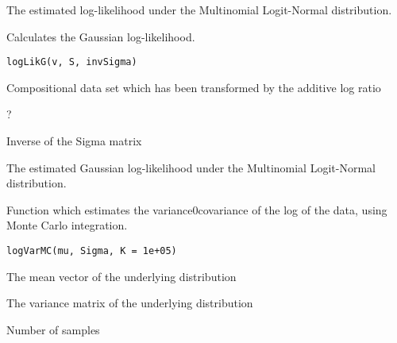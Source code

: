 \documentclass[a4paper]{book}
\begin{document}
%
\begin{Value}
The estimated log-likelihood under the Multinomial Logit-Normal distribution.
\end{Value}
%
\begin{Description}\relax
Calculates the Gaussian log-likelihood.
\end{Description}
%
\begin{Usage}
\begin{verbatim}
logLikG(v, S, invSigma)
\end{verbatim}
\end{Usage}
%
\begin{Arguments}
\begin{ldescription}
\item[\code{v}] Compositional data set which has been transformed by the additive 
log ratio

\item[\code{S}] ?

\item[\code{invSigma}] Inverse of the Sigma matrix
\end{ldescription}
\end{Arguments}
%
\begin{Value}
The estimated Gaussian log-likelihood under the Multinomial Logit-Normal distribution.
\end{Value}
%
\begin{Description}\relax
Function which estimates the variance0covariance of the log of the data, using Monte
Carlo integration.
\end{Description}
%
\begin{Usage}
\begin{verbatim}
logVarMC(mu, Sigma, K = 1e+05)
\end{verbatim}
\end{Usage}
%
\begin{Arguments}
\begin{ldescription}
\item[\code{mu}] The mean vector of the underlying distribution

\item[\code{Sigma}] The variance matrix of the underlying distribution

\item[\code{K}] Number of samples
\end{ldescription}
\end{Arguments}
\end{document}
